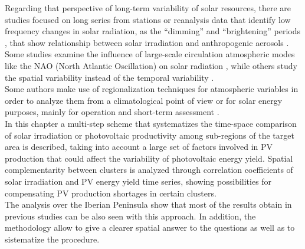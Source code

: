 Regarding that perspective of long-term variability of solar resources, there are studies focused on long series from stations \citep{Sanchez-Lorenzo2009, Sanchez-Lorenzo2013, vazquez2012interannual} or reanalysis data that identify low frequency changes in solar radiation, as the “dimming” and “brightening” periods \citep{Wild2005}, that show relationship between solar irradiation and anthropogenic aerosols \citep{Nabat2014a}. Some studies examine the influence of large-scale circulation atmospheric modes like the NAO (North Atlantic Oscillation) on solar radiation \citep{Pozo-Vazquez2004, Jerez2013}, while others study the spatial variability instead of the temporal variability \citep{Gueymard.Wilcox2011a}.\\ 

Some authors make use of regionalization techniques for atmospheric variables in order to analyze them from a climatological point of view \citep{Argueso2011} or for solar energy purposes, mainly for operation and short-term assessment \citep{Zagouras2013, Zagouras2014, Zagouras.Pedro.2014}.\\

In this chapter a multi-step scheme that systematizes the time-space comparison of solar irradiation or photovoltaic productivity among sub-regions of the target area is described, taking into account a large set of factors involved in PV production that could affect the variability of photovoltaic energy yield. Spatial complementarity between clusters is analyzed through correlation coefficients of solar irradiation and PV energy yield time series, showing possibilities for compensating PV production shortages in certain clusters.\\

The analysis over the Iberian Peninsula show that most of the results obtain in previous studies can be also seen with this approach. In addition, the methodology allow to give a clearer spatial answer to the questions as well as to sistematize the procedure.\\


